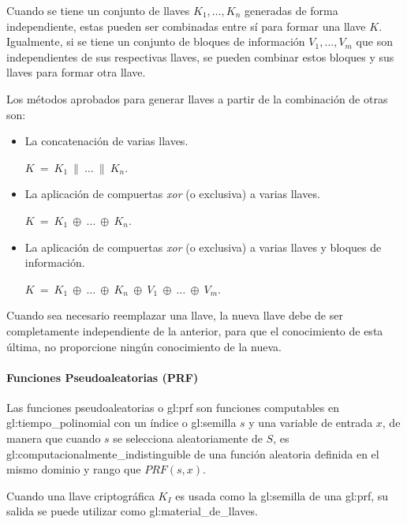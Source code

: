 Cuando se tiene un conjunto de llaves $K_1, \dots, K_n$ generadas de forma 
independiente, estas pueden ser combinadas entre sí para formar una llave $K$. 
Igualmente, si se tiene un conjunto de bloques de información $V_1, \dots, 
V_m$ que son independientes de sus respectivas llaves, se pueden combinar 
estos bloques y sus llaves para formar otra llave. 

Los métodos aprobados para generar llaves a partir de la combinación de 
otras son: 
\begin{itemize}

  \item La concatenación de varias llaves.

    $K\: =\: K_1\: \parallel\: \dots\: \parallel\: K_n$.

  \item La aplicación de compuertas \textit{xor} (o exclusiva) a varias llaves.

    $K\: =\: K_1\: \oplus\: \dots\: \oplus\: K_n$.
  
  \item La aplicación de compuertas \textit{xor} (o exclusiva) a varias llaves 
    y bloques de información.

    $K\: =\: K_1\: \oplus\: \dots\: \oplus\: K_n\: 
    \oplus\: V_1\: \oplus\: \dots\: \oplus\: V_m$.

\end{itemize}

Cuando sea necesario reemplazar una llave, la nueva llave debe de ser 
completamente independiente de la anterior, para que el conocimiento de esta 
última, no proporcione ningún conocimiento de la nueva.


\paragraph{Funciones Pseudoaleatorias (PRF)}

Las funciones pseudoaleatorias o \gls{gl:prf} son funciones computables en 
\gls{gl:tiempo_polinomial} con un índice o \gls{gl:semilla} $s$ y una variable 
de entrada $x$, de manera que cuando $s$ se selecciona aleatoriamente de $S$, 
es \gls{gl:computacionalmente_indistinguible} de una función aleatoria 
definida en el mismo dominio y rango que $PRF(s,x)$.

Cuando una llave criptográfica $K_I$ es usada como la \gls{gl:semilla} de una 
\gls{gl:prf}, su salida se puede utilizar como \gls{gl:material_de_llaves}.

